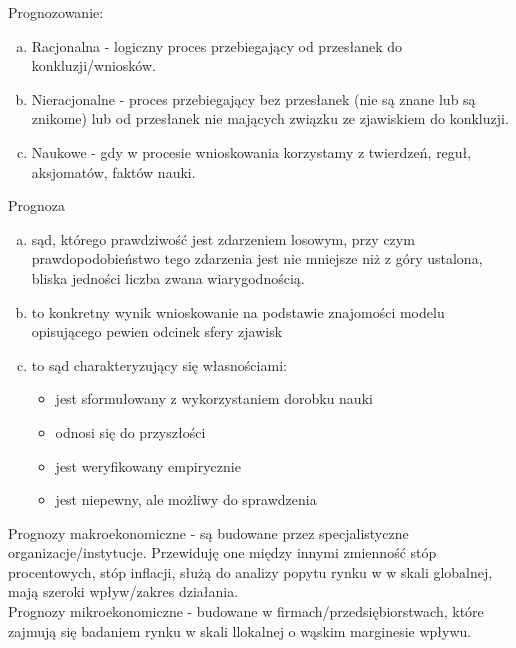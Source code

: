 Prognozowanie:
\begin{enumerate}[a)]
\item Racjonalna - logiczny proces przebiegający od przesłanek do konkluzji/wniosków.
\item Nieracjonalne - proces przebiegający bez przesłanek (nie są znane lub są znikome) lub od przesłanek nie mających związku ze zjawiskiem do konkluzji.
\item Naukowe - gdy w procesie wnioskowania korzystamy z twierdzeń, reguł, aksjomatów, faktów nauki.
\end{enumerate}
Prognoza
\begin{enumerate}[a)]
\item sąd, którego prawdziwość jest zdarzeniem losowym, przy czym prawdopodobieństwo tego zdarzenia jest nie mniejsze niż  z góry ustalona, bliska jedności liczba zwana wiarygodnością.
\item to konkretny wynik wnioskowanie na podstawie znajomości modelu opisującego pewien odcinek sfery zjawisk
\item to sąd charakteryzujący się własnościami:
\begin{itemize}
\item jest sformułowany z wykorzystaniem dorobku nauki
\item odnosi się do przyszłości
\item jest weryfikowany empirycznie
\item jest niepewny, ale możliwy do sprawdzenia
\end{itemize}
\end{enumerate}
Prognozy makroekonomiczne - są budowane przez specjalistyczne organizacje/instytucje. Przewiduję one między innymi zmienność stóp procentowych, stóp inflacji, służą do analizy popytu rynku w w skali globalnej, mają szeroki wpływ/zakres działania.\\
Prognozy mikroekonomiczne - budowane w firmach/przedsiębiorstwach, które zajmują się badaniem rynku w skali llokalnej o wąskim marginesie wpływu.

